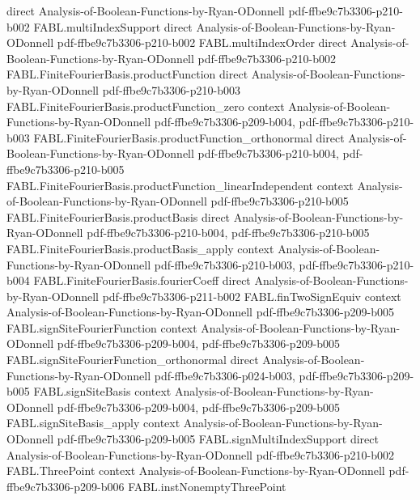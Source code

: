 \begin{theorem}
  {direct}
  {Analysis-of-Boolean-Functions-by-Ryan-ODonnell}
  {pdf-ffbe9c7b3306-p210-b002}
\proofstep
  {FABL.multiIndexSupport}
  {direct}
  {Analysis-of-Boolean-Functions-by-Ryan-ODonnell}
  {pdf-ffbe9c7b3306-p210-b002}
\proofstep
  {FABL.multiIndexOrder}
  {direct}
  {Analysis-of-Boolean-Functions-by-Ryan-ODonnell}
  {pdf-ffbe9c7b3306-p210-b002}
\proofstep
  {FABL.FiniteFourierBasis.productFunction}
  {direct}
  {Analysis-of-Boolean-Functions-by-Ryan-ODonnell}
  {pdf-ffbe9c7b3306-p210-b003}
\proofstep
  {FABL.FiniteFourierBasis.productFunction_zero}
  {context}
  {Analysis-of-Boolean-Functions-by-Ryan-ODonnell}
  {pdf-ffbe9c7b3306-p209-b004,
    pdf-ffbe9c7b3306-p210-b003}
\proofstep
  {FABL.FiniteFourierBasis.productFunction_orthonormal}
  {direct}
  {Analysis-of-Boolean-Functions-by-Ryan-ODonnell}
  {pdf-ffbe9c7b3306-p210-b004,
    pdf-ffbe9c7b3306-p210-b005}
\proofstep
  {FABL.FiniteFourierBasis.productFunction_linearIndependent}
  {context}
  {Analysis-of-Boolean-Functions-by-Ryan-ODonnell}
  {pdf-ffbe9c7b3306-p210-b005}
\proofstep
  {FABL.FiniteFourierBasis.productBasis}
  {direct}
  {Analysis-of-Boolean-Functions-by-Ryan-ODonnell}
  {pdf-ffbe9c7b3306-p210-b004,
    pdf-ffbe9c7b3306-p210-b005}
\proofstep
  {FABL.FiniteFourierBasis.productBasis_apply}
  {context}
  {Analysis-of-Boolean-Functions-by-Ryan-ODonnell}
  {pdf-ffbe9c7b3306-p210-b003,
    pdf-ffbe9c7b3306-p210-b004}
\proofstep
  {FABL.FiniteFourierBasis.fourierCoeff}
  {direct}
  {Analysis-of-Boolean-Functions-by-Ryan-ODonnell}
  {pdf-ffbe9c7b3306-p211-b002}
\proofstep
  {FABL.finTwoSignEquiv}
  {context}
  {Analysis-of-Boolean-Functions-by-Ryan-ODonnell}
  {pdf-ffbe9c7b3306-p209-b005}
\proofstep
  {FABL.signSiteFourierFunction}
  {context}
  {Analysis-of-Boolean-Functions-by-Ryan-ODonnell}
  {pdf-ffbe9c7b3306-p209-b004,
    pdf-ffbe9c7b3306-p209-b005}
\proofstep
  {FABL.signSiteFourierFunction_orthonormal}
  {direct}
  {Analysis-of-Boolean-Functions-by-Ryan-ODonnell}
  {pdf-ffbe9c7b3306-p024-b003,
    pdf-ffbe9c7b3306-p209-b005}
\proofstep
  {FABL.signSiteBasis}
  {context}
  {Analysis-of-Boolean-Functions-by-Ryan-ODonnell}
  {pdf-ffbe9c7b3306-p209-b004,
    pdf-ffbe9c7b3306-p209-b005}
\proofstep
  {FABL.signSiteBasis_apply}
  {context}
  {Analysis-of-Boolean-Functions-by-Ryan-ODonnell}
  {pdf-ffbe9c7b3306-p209-b005}
\proofstep
  {FABL.signMultiIndexSupport}
  {direct}
  {Analysis-of-Boolean-Functions-by-Ryan-ODonnell}
  {pdf-ffbe9c7b3306-p210-b002}
\proofstep
  {FABL.ThreePoint}
  {context}
  {Analysis-of-Boolean-Functions-by-Ryan-ODonnell}
  {pdf-ffbe9c7b3306-p209-b006}
\proofstep
  {FABL.instNonemptyThreePoint}

\end{theorem}

